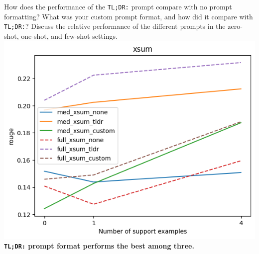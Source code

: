 \documentclass[12pt]{article}
\begin{document}
\begin{enumerate}
    How does the performance of the \texttt{TL;DR:} prompt compare with no prompt formatting? What was your custom prompt format, and how did it compare with \texttt{TL;DR:}? Discuss the relative performance of the different prompts in the zero-shot, one-shot, and few-shot settings.\\    
\includegraphics[width=\linewidth]{hw3_starter_code/starter_code/Q1_3.png}            
    \textbf{\color{red}\texttt{TL;DR:} prompt format performs the best among three.}

\end{enumerate}
\end{document}
